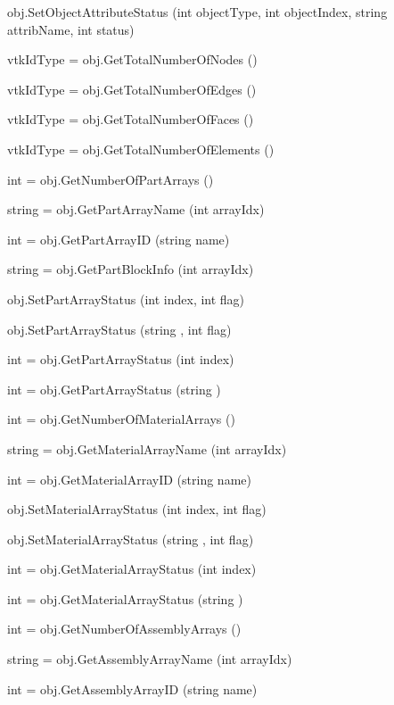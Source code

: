 \begin{DoxyItemize}
\item {\ttfamily obj.\-Set\-Object\-Attribute\-Status (int object\-Type, int object\-Index, string attrib\-Name, int status)}  
\item {\ttfamily vtk\-Id\-Type = obj.\-Get\-Total\-Number\-Of\-Nodes ()}  
\item {\ttfamily vtk\-Id\-Type = obj.\-Get\-Total\-Number\-Of\-Edges ()}  
\item {\ttfamily vtk\-Id\-Type = obj.\-Get\-Total\-Number\-Of\-Faces ()}  
\item {\ttfamily vtk\-Id\-Type = obj.\-Get\-Total\-Number\-Of\-Elements ()}  
\item {\ttfamily int = obj.\-Get\-Number\-Of\-Part\-Arrays ()}  
\item {\ttfamily string = obj.\-Get\-Part\-Array\-Name (int array\-Idx)}  
\item {\ttfamily int = obj.\-Get\-Part\-Array\-I\-D (string name)}  
\item {\ttfamily string = obj.\-Get\-Part\-Block\-Info (int array\-Idx)}  
\item {\ttfamily obj.\-Set\-Part\-Array\-Status (int index, int flag)}  
\item {\ttfamily obj.\-Set\-Part\-Array\-Status (string , int flag)}  
\item {\ttfamily int = obj.\-Get\-Part\-Array\-Status (int index)}  
\item {\ttfamily int = obj.\-Get\-Part\-Array\-Status (string )}  
\item {\ttfamily int = obj.\-Get\-Number\-Of\-Material\-Arrays ()}  
\item {\ttfamily string = obj.\-Get\-Material\-Array\-Name (int array\-Idx)}  
\item {\ttfamily int = obj.\-Get\-Material\-Array\-I\-D (string name)}  
\item {\ttfamily obj.\-Set\-Material\-Array\-Status (int index, int flag)}  
\item {\ttfamily obj.\-Set\-Material\-Array\-Status (string , int flag)}  
\item {\ttfamily int = obj.\-Get\-Material\-Array\-Status (int index)}  
\item {\ttfamily int = obj.\-Get\-Material\-Array\-Status (string )}  
\item {\ttfamily int = obj.\-Get\-Number\-Of\-Assembly\-Arrays ()}  
\item {\ttfamily string = obj.\-Get\-Assembly\-Array\-Name (int array\-Idx)}  
\item {\ttfamily int = obj.\-Get\-Assembly\-Array\-I\-D (string name)}  

\end{DoxyItemize}
